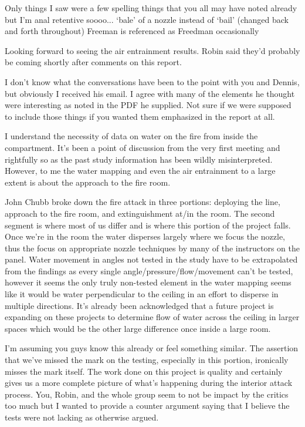 \documentclass[12pt,oneside]{book}
\begin{document}
\begin{appendix}
Only things I saw were a few spelling things that you all may have noted already but I'm anal retentive soooo... 
`bale' of a nozzle instead of `bail' (changed back and forth throughout)
Freeman is referenced as Freedman occasionally
 
Looking forward to seeing the air entrainment results.  Robin said they'd probably be coming shortly after comments on this report.

\makebox[\linewidth]{\rule{\textwidth}{0.4pt}}

I don't know what the conversations have been to the point with you and Dennis, but obviously I received his email.  I agree with many of the elements he thought were interesting as noted in the PDF he supplied.  Not sure if we were supposed to include those things if you wanted them emphasized in the report at all.
 
I understand the necessity of data on water on the fire from inside the compartment.  It's been a point of discussion from the very first meeting and rightfully so as the past study information has been wildly misinterpreted.  However, to me the water mapping and even the air entrainment to a large extent is about the approach to the fire room.  
 
John Chubb broke down the fire attack in three portions:  deploying the line, approach to the fire room, and extinguishment at/in the room. The second segment is where most of us differ and is where this portion of the project falls.  Once we're in the room the water disperses largely where we focus the nozzle, thus the focus on appropriate nozzle techniques by many of the instructors on the panel.  Water movement in angles not tested in the study have to be extrapolated from the findings as every single angle/pressure/flow/movement can't be tested, however it seems the only truly non-tested element in the water mapping seems like it would be water perpendicular to the ceiling in an effort to disperse in multiple directions.  It's already been acknowledged that a future project is expanding on these projects to determine flow of water across the ceiling in larger spaces which would be the other large difference once inside a large room.
 
I'm assuming you guys know this already or feel something similar.  The assertion that we've missed the mark on the testing, especially in this portion, ironically misses the mark itself.  The work done on this project is quality and certainly gives us a more complete picture of what's happening during the interior attack process.  You, Robin, and the whole group seem to not be impact by the critics too much but I wanted to provide a counter argument saying that I believe the tests were not lacking as otherwise argued.  


\end{appendix}
\end{document}
